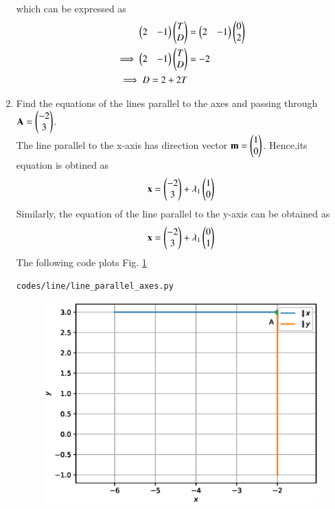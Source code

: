 \begin{enumerate}[label=\arabic*.,ref=\thesubsection.\theenumi]
\begin{align}
\end{align}
%
which can be expressed as
\begin{align}
\begin{pmatrix}2 & -1\end{pmatrix}\begin{pmatrix}T\\D\end{pmatrix} &= \begin{pmatrix}2 & -1\end{pmatrix}\begin{pmatrix}0\\2\end{pmatrix}\\
\implies \begin{pmatrix}2 & -1\end{pmatrix}\begin{pmatrix}T\\D\end{pmatrix} &= -2
\\
\implies D = 2+2T
\end{align}
%
\item Find the equations of the lines parallel to the axes and passing through $\mathbf{A}=\begin{pmatrix}-2\\3\end{pmatrix}$.
%
\\
\solution The line parallel to the x-axis has direction vector $\mathbf{m}=\begin{pmatrix}1\\0\end{pmatrix}$.  Hence,its equation is obtined as
\begin{align}
%
\label{eq:line_dir_vec}
\vec{x} = \myvec{-2\\3} + \lambda_1\myvec{1\\0}
\end{align}
%
Similarly, the equation of the line parallel to the y-axis can be obtained as
\begin{align}
\mathbf{x} = \begin{pmatrix}-2\\3\end{pmatrix} + \lambda_1\begin{pmatrix}0\\1\end{pmatrix}
\end{align}
%
The following code plots Fig. \ref{fig:line_parallel_axes}
%
\begin{lstlisting}
codes/line/line_parallel_axes.py
\end{lstlisting}
%
\begin{figure}[!ht]
\includegraphics[width=\columnwidth]{./line/figs/line_parallel_axes.eps}
\caption{}
\label{fig:line_parallel_axes}
\end{figure}


\end{enumerate}
